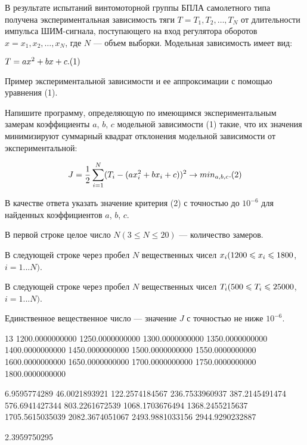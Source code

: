 
В результате испытаний винтомоторной группы БПЛА самолетного типа получена экспериментальная 
зависимость тяги $T= {T_1, T_2, \dots, T_N}$ от длительности импульса ШИМ-сигнала,
поступающего на вход регулятора оборотов $x = {x_1, x_2,
\dots ,x_N}$, где \linebreak $N$ — объем выборки. Модельная зависимость имеет вид:

$T= ax^2 + bx + c.\space(1)$


Пример экспериментальной
зависимости и ее аппроксимации с помощью уравнения (1).

Напишите программу, определяющую по имеющимся
экспериментальным замерам коэффициенты $a$, $b$, $c$  модельной зависимости (1) 
такие, что их значения минимизируют суммарный квадрат отклонения модельной
зависимости от экспериментальной:

$$J=\frac{1}{2} \sum\limits_{i=1}^N(T_i-(ax_i^2+bx_i+c))^2 \to min_{a,b,c}.\space (2) $$

В качестве ответа указать значение критерия (2) с точностью до $10^{-6}$ для найденных коэффициентов 
$a$, $b$, $c$.


В первой строке целое число $N (3\leq N\leq 20)$  — количество замеров.

В следующей строке через пробел $N$  вещественных чисел $x_i\space (1200\leq x_i \leq 1800$,\linebreak $i = 1...N)$. 

В следующей строке через пробел $N$  вещественных чисел $T_i\space (500\leq T_i \leq 25000$, \linebreak $i = 1...N)$.

\outputfmtSection

Единственное вещественное число — значение  $J$  с точностью не ниже $10^{-6}$.


\begin{myverbbox}[\small]{\vinput}
    13
    1200.0000000000 1250.0000000000 1300.0000000000 1350.0000000000 
    1400.0000000000 1450.0000000000 1500.0000000000 1550.0000000000 
    1600.0000000000 1650.0000000000 1700.0000000000 1750.0000000000 
    1800.0000000000 
    
    6.9595774289 46.0021893921 122.2574184567 236.7533960937 
    387.2145491474 576.6941427344 803.2261672539 1068.1703676494 
    1368.2455215637 1705.5615035039 2082.3674051067 2493.9881033156 
    2944.9290232887
\end{myverbbox}
\begin{myverbbox}[\small]{\voutput}
    2.3959750295
\end{myverbbox}


